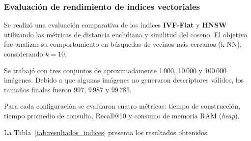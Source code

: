\documentclass[11pt,a4paper]{article}
\begin{document}
\subsubsection{Evaluación de rendimiento de índices vectoriales}

Se realizó una evaluación comparativa de los índices \textbf{IVF-Flat} y \textbf{HNSW} utilizando las métricas de distancia euclidiana y similitud del coseno. El objetivo fue analizar su comportamiento en búsquedas de vecinos más cercanos (k-NN), considerando $k=10$.

Se trabajó con tres conjuntos de aproximadamente 1\,000, 10\,000 y 100\,000 imágenes. Debido a que algunas imágenes no generaron descriptores válidos, los tamaños finales fueron 997, 9\,987 y 99\,785.

Para cada configuración se evaluaron cuatro métricas: tiempo de construcción, tiempo promedio de consulta, Recall@10 y consumo de memoria RAM (\emph{heap}).


La Tabla~\ref{tab:resultados_indices} presenta los resultados obtenidos.

\begin{table}[htbp]
\centering
\caption{Comparación de IVF-Flat y HNSW}
\label{tab:resultados_indices}
\scriptsize
{}
\end{table}
\end{document}
